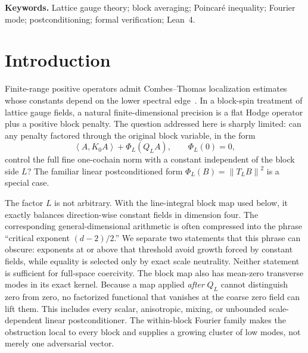 \documentclass[11pt]{article}
\theoremstyle{definition}
\newcommand{\ip}[2]{\left\langle #1,#2\right\rangle}
\newcommand{\norm}[1]{\left\lVert #1\right\rVert}
\newcommand{\lean}[1]{\texttt{#1}}
\begin{document}
\begin{abstract}
The construction, kernel identities, exact Hodge energy, factorized-penalty
no-go, repair Rayleigh identity, and necessary repair budget are formalized in
Lean~4.  The focused axiom audit reports only \lean{propext},
\lean{Classical.choice}, and \lean{Quot.sound}.  The higher-frequency spectral
multiplicity theorem is proved analytically here and is not claimed as part of
the formalized surface.  The theorem concerns the stated flat full-domain form; it
does not contradict gauge-restricted propagator constructions and makes no
infinite-volume, continuum, or Yang--Mills mass-gap claim.
\end{abstract}

\noindent\textbf{Keywords.}
Lattice gauge theory; block averaging; Poincar\'e inequality; Fourier mode;
postconditioning; formal verification; Lean~4.

\section{Introduction}

Finite-range positive operators admit Combes--Thomas localization estimates
whose constants depend on the lower spectral edge~\cite{CombesThomas}.  In a
block-spin treatment of lattice gauge fields, a natural finite-dimensional
precision is a flat Hodge operator plus a positive block penalty.  The
question addressed here is sharply limited: can any penalty factored through
the original block variable, in the form
\begin{equation}\label{eq:intro-form}
 \ip{A}{K_0A}+\Phi_L(Q_LA),\qquad \Phi_L(0)=0,
\end{equation}
control the full fine one-cochain norm with a constant independent of the
block side $L$?  The familiar linear postconditioned form
$\Phi_L(B)=\norm{T_LB}^2$ is a special case.

The factor $L$ is not arbitrary.  With the line-integral block map used below,
it exactly balances direction-wise constant fields in dimension four.  The
corresponding general-dimensional arithmetic is often compressed into the
phrase ``critical exponent $(d-2)/2$.''  We separate two statements that this
phrase can obscure: exponents at or above that threshold avoid growth forced
by constant fields, while equality is selected only by exact scale neutrality.
Neither statement is sufficient for full-space coercivity.  The block map also
has mean-zero transverse modes in its exact kernel.  Because a map applied
\emph{after} $Q_L$ cannot distinguish zero from zero, no factorized functional
that vanishes at the coarse zero field can lift them.  This includes every
scalar, anisotropic, mixing, or unbounded scale-dependent linear
postconditioner.  The within-block Fourier family makes the obstruction local
to every block and supplies a growing cluster of low modes, not merely one
adversarial vector.
\end{document}
